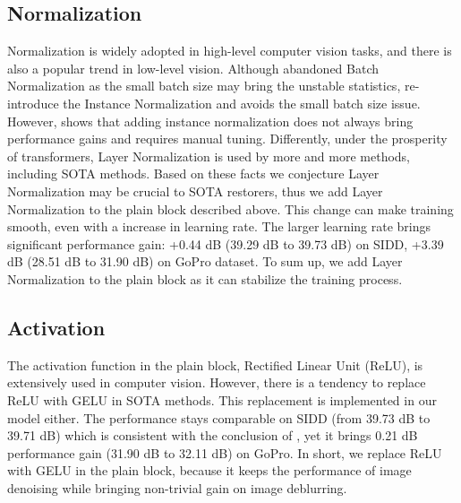 \documentclass[runningheads]{llncs}
\begin{document}
\subsection{Normalization}
Normalization is widely adopted in high-level computer vision tasks, and there is also a popular trend in low-level vision. 
Although \cite{nah2017deep} abandoned Batch Normalization\cite{ioffe2015batch} as the small batch size may bring the unstable statistics\cite{yan2020towards}, \cite{chen2021hinet} re-introduce the Instance Normalization\cite{ulyanov2016instance} and avoids the small batch size issue. However, \cite{chen2021hinet} shows that adding instance normalization does not always bring performance gains and requires manual tuning. Differently, under the prosperity of transformers, Layer Normalization\cite{ba2016layer} is used by more and more methods, including SOTA methods\cite{tu2022maxim,zamir2021restormer,wang2021uformer,liu2022convnet,liu2021swin}. Based on these facts we conjecture Layer Normalization may be crucial to SOTA restorers, thus we add Layer Normalization to the plain block described above. This change can make training smooth, even with a  increase in learning rate. The larger learning rate brings significant performance gain: +0.44 dB (39.29 dB to 39.73 dB) on SIDD\cite{SIDD_2018_CVPR}, +3.39 dB (28.51 dB to 31.90 dB) on GoPro\cite{nah2017deep} dataset. To sum up, we add Layer Normalization to the plain block as it can stabilize the training process.



\subsection{Activation}
The activation function in the plain block, Rectified Linear Unit\cite{nair2010rectified} (ReLU), is extensively used in computer vision. However, there is a tendency to replace ReLU with GELU\cite{hendrycks2016gaussian} in SOTA methods\cite{liu2022convnet,zamir2021restormer,tu2022maxim,liu2021swin,dosovitskiy2020image}. 
This replacement is implemented in our model either. The performance stays comparable on SIDD (from 39.73 dB to 39.71 dB) which is consistent with the conclusion of \cite{liu2022convnet}, yet it brings 0.21 dB performance gain (31.90 dB to 32.11 dB) on GoPro. In short, we replace ReLU with GELU in the plain block, because it keeps the performance of image denoising while bringing non-trivial gain on image deblurring.
\end{document}

